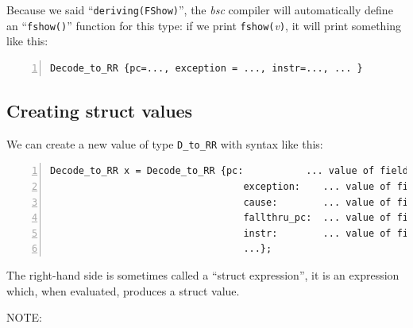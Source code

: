 \vspace{2ex}


Because we said ``\verb|deriving(FShow)|'', the \emph{bsc} compiler
will automatically define an ``\verb|fshow()|'' function for this
type: if we print \verb|fshow(|\emph{v}\verb|)|, it will print
something like this:

{\small
\begin{Verbatim}[frame=single, numbers=left]
Decode_to_RR {pc=..., exception = ..., instr=..., ... }
\end{Verbatim}
}


\subsection{Creating struct values}


We can create a new value of type \verb|D_to_RR| with syntax like
this:

{\small
\begin{Verbatim}[frame=single, numbers=left]
   Decode_to_RR x = Decode_to_RR {pc:           ... value of field ... ,
                                  exception:    ... value of field ... ,
                                  cause:        ... value of field ... ,
                                  fallthru_pc:  ... value of field ... ,
                                  instr:        ... value of field ... ,
                                  ...};
\end{Verbatim}
}

The right-hand side is sometimes called a ``struct expression'', {\ie}
it is an expression which, when evaluated, produces a struct value.

\vspace{2ex}

NOTE:


